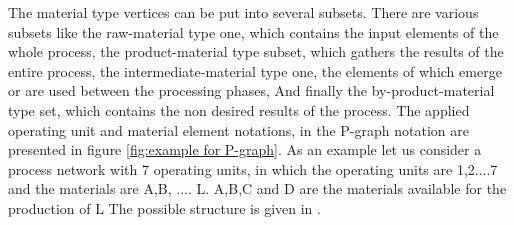 The material type vertices can be put into several subsets. There are various subsets like the raw-material type one, which contains  the input elements of the whole process, the product-material type subset, which gathers the results of the entire process, the intermediate-material type one, the elements of which emerge or are used between the processing phases\cite{pns2}, And finally the by-product-material  type set, which contains the non desired results of the process. The applied operating unit and material element notations, in the P-graph notation are presented in figure \ref{fig:example for P-graph}. As an example let us consider a process network with 7 operating units, 
in which the operating units are 1,2....7 and the materials are A,B, .... L. A,B,C and D 
are the materials available for the production of L The possible structure is given in \cite{pns2, pns4}. 
 


